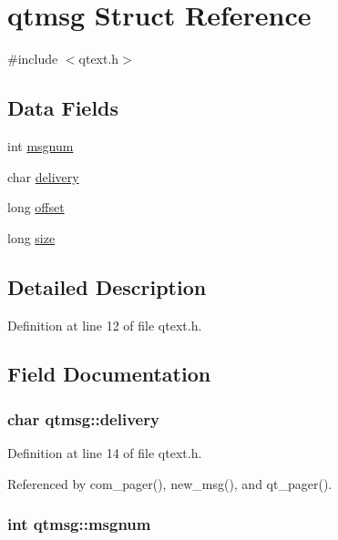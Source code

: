 \hypertarget{structqtmsg}{\section{qtmsg Struct Reference}
\label{structqtmsg}
}


{\ttfamily \#include $<$qtext.\+h$>$}

\subsection*{Data Fields}
\begin{DoxyCompactItemize}
\item 
int \hyperlink{structqtmsg_a14ccc152b3ebd69ecc3b24fe7771c0e2}{msgnum}
\item 
char \hyperlink{structqtmsg_a3fee396a42086b53958e22f7aea1583d}{delivery}
\item 
long \hyperlink{structqtmsg_a422909f4fbac3cf1b6a2890e06d4729a}{offset}
\item 
long \hyperlink{structqtmsg_a581321cc38e8c15acbf2310751c3b115}{size}
\end{DoxyCompactItemize}


\subsection{Detailed Description}


Definition at line 12 of file qtext.\+h.



\subsection{Field Documentation}
\hypertarget{structqtmsg_a3fee396a42086b53958e22f7aea1583d}{
\subsubsection[{delivery}]{\setlength{\rightskip}{0pt plus 5cm}char qtmsg\+::delivery}}\label{structqtmsg_a3fee396a42086b53958e22f7aea1583d}


Definition at line 14 of file qtext.\+h.



Referenced by com\+\_\+pager(), new\+\_\+msg(), and qt\+\_\+pager().

\hypertarget{structqtmsg_a14ccc152b3ebd69ecc3b24fe7771c0e2}{
\subsubsection[{msgnum}]{\setlength{\rightskip}{0pt plus 5cm}int qtmsg\+::msgnum}}\label{structqtmsg_a14ccc152b3ebd69ecc3b24fe7771c0e2}



